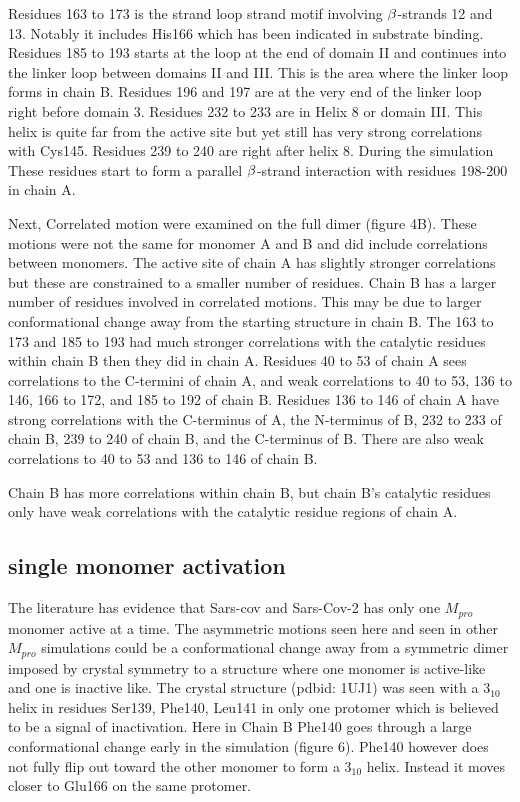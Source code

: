 \documentclass{biophys-new}
\begin{document}
Residues 163 to 173 is the strand loop strand motif involving $\MakeUppercase{\beta}$-strands 12 and 13. Notably it includes His166 which has been indicated in substrate binding. Residues 185 to 193 starts at the loop at the end of domain II and continues into the linker loop between domains II and III. This is the area where the linker loop forms in chain B. Residues 196 and 197 are at the very end of the linker loop right before domain 3. Residues 232 to 233 are in Helix 8 or domain III. This helix is quite far from the active site but yet still has very strong correlations with Cys145. Residues 239 to 240 are right after helix 8. During the simulation These residues start to form a parallel $\MakeUppercase{\beta}$-strand interaction with residues 198-200 in chain A.

Next, Correlated motion were examined on the full dimer (figure 4B). These motions were not the same for monomer A and B and did include correlations between monomers. The active site of chain A has slightly stronger correlations but these are constrained to a smaller number of residues. Chain B has a larger number of residues involved in correlated motions. This may be due to larger conformational change away from the starting structure in chain B. The 163 to 173 and 185 to 193 had much stronger correlations with the catalytic residues within chain B then they did in chain A. Residues 40 to 53 of chain A sees correlations to the C-termini of chain A, and weak correlations to 40 to 53, 136 to 146, 166 to 172, and 185 to 192 of chain B. Residues 136 to 146 of chain A have strong correlations with the C-terminus of A, the N-terminus of B, 232 to 233 of chain B, 239 to 240 of chain B, and the C-terminus of B. There are also weak correlations to 40 to 53 and 136 to 146 of chain B.

Chain B has more correlations within chain B, but chain B's catalytic residues only have weak correlations with the catalytic residue regions of chain A. 

\subsection*{single monomer activation}

The literature has evidence that Sars-cov\cite{chen2006only} and Sars-Cov-2 has only one $M_{pro}$ monomer active at a time. The asymmetric motions seen here and seen in other $M_{pro}$ simulations\cite{inizan2021high} could be a conformational change away from a symmetric dimer imposed by crystal symmetry to a structure where one monomer is active-like and one is inactive like. The crystal structure (pdbid: 1UJ1) was seen with a $3_{10}$ helix in residues Ser139, Phe140, Leu141 in only one protomer which is believed to be a signal of inactivation. Here in Chain B Phe140 goes through a large conformational change early in the simulation (figure 6). Phe140 however does not fully flip out toward the other monomer to form a $3_{10}$ helix. Instead it moves closer to Glu166 on the same protomer.
\end{document}

